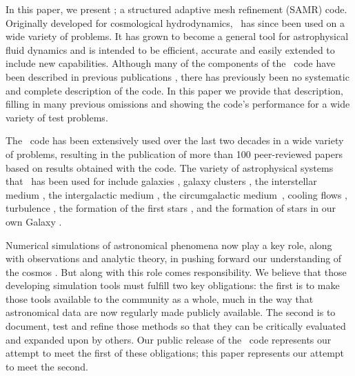 In this paper, we present \enzo; a structured adaptive mesh refinement
(SAMR) code. Originally developed for cosmological hydrodynamics,
\enzo\ has since been used on a wide variety of problems.  It has
grown to become a general tool for astrophysical fluid dynamics and is
intended to be efficient, accurate and easily extended to include new
capabilities.  Although many of the components of the \enzo\ code have
been described in previous publications \citep{1995CoPhC..89..149B,
BryanThesis96, Bryan97a, Bryan97b, Norman99, BryanCompSci99, Bryan01,
Oshea04, 2007arXiv0705.1556N,
WangAbelZhang08,ReynoldsHayesPaschosNorman2009,Collins10,Wise11_Moray},
there has previously been no systematic and complete description of
the code.  In this paper we provide that description, filling in many
previous omissions and showing the code's performance for a wide
variety of test problems.

The \enzo\ code has been extensively used over the last two decades in
a wide variety of problems, resulting in the publication of more than
100 peer-reviewed papers based on results obtained with the code. The
variety of astrophysical systems that \enzo\ has been used for include
galaxies \citep{2003ApJ...587...13T, 2012MNRAS.425..641L,
  2012ApJ...749..140H, 2013MNRAS.432.1989S}, galaxy
clusters \citep{Loken02, Xu11, Skillman13}, the interstellar medium
\citep{Slyz05}, the intergalactic medium \citep{Fang01, 
2011ApJ...731....6S}, the circumgalactic
medium~\citep{2013MNRAS.430.1548H}, cooling flows \citep{Li12, 2013ApJ...763...38S},
turbulence \citep{Kritsuk04, 2007ApJ...665..416K, 2009JPhCS.180a2020K, Collins11}, the
formation of the first stars \citep{ABN02, 2007ApJ...654...66O,
2009Sci...325..601T, Xu08}, and the formation of stars in our own Galaxy
\citep{Collins11, 2011ApJ...727L..20K, Collins12a}.

Numerical simulations of astronomical phenomena now play a key role,
along with observations and analytic theory, in pushing forward our
understanding of the cosmos \citep[e.g.,][]{DecadalSurvey01,
DecadalSurvey10}.  But along with this role comes responsibility.  We
believe that those developing simulation tools must fulfill two key
obligations: the first is to make those tools available to the
community as a whole, much in the way that astronomical data are now
regularly made publicly available.  The second is to document, test
and refine those methods so that they can be critically evaluated and
expanded upon by others.  Our public release of the \enzo\ code represents our
attempt to meet the first of these obligations; this paper represents
our attempt to meet the second.

